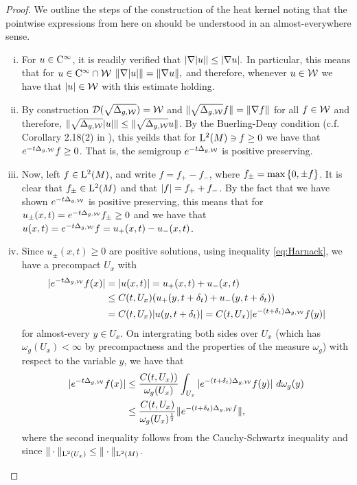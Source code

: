 \documentclass[a4paper, 12pt]{amsart}
\begin{document}
\begin{proof}
We outline the steps of the construction of the heat kernel
noting that the pointwise expressions from here on should be
understood in an almost-everywhere sense.
\begin{enumerate}[(i)]
\item For $u \in {\rm C}^{\infty}_{\rm {}}$, it is readily verified that 
	$| \nabla |u|| \leq | \nabla u|.$
	In particular, this means that 
	for $u \in {\rm C}^{\infty}_{\rm {}} \cap \mathcal{W}$
	$\| \nabla |u| \| = \| \nabla u \|,$
	and therefore, whenever $u \in \mathcal{W}$
	we have that $|u| \in \mathcal{W}$ 
	with this estimate holding.

\item 	By construction ${\mathcal{D}}(\sqrt{\Delta_{g, \mathcal{W}}}) = \mathcal{W}$
	and $\| \sqrt{\Delta_{g,\mathcal{W}}} f \| = \| \nabla f \|$
	for all $f \in \mathcal{W}$ and therefore, 
	$\| \sqrt{\Delta_{g, \mathcal{W}}} |u| \| 
		\leq \| \sqrt{\Delta_{g, \mathcal{W}}} u \|$. 
	By the Buerling-Deny condition (c.f.  Corollary 2.18(2) in  \cite{El-Maati}), 
	this yeilds that for ${\rm L}^{2}_{\rm {}}(M) \ni f \geq 0$
	we have that  $e^{-t \Delta_{g,\mathcal{W}}} f \geq 0$. That is, the semigroup 
	$e^{-t \Delta_{g,\mathcal{W}}}$ is positive preserving.  

\item Now, left $f \in {\rm L}^{2}_{\rm {}}(M)$, and write
	$f = f_+ - f_-$, where $f_{\pm} = \max\left\{0,\pm f\right\}$.
	It is clear that $f_{\pm} \in {\rm L}^{2}_{\rm {}}(M)$
	and that $|f| = f_+ + f_-$.
	By the fact that we have shown $e^{-t\Delta_{g,\mathcal{W}}}$ 
	is positive preserving, this means that
	for $u_{\pm} (x,t) = e^{-t\Delta_{g,\mathcal{W}}} f_{\pm} \geq 0$	
	and we have that $u(x,t) = e^{-t \Delta_{g,\mathcal{W}}} f = u_+(x,t) - u_-(x,t)$.

\item  Since $u_{\pm}(x,t) \geq 0$ are positive solutions,
	using inequality \eqref{eq:Harnack}, we have a precompact $U_x$ 
	with 
	\begin{align*} 
	|e^{-t \Delta_{g,\mathcal{W}}}f(x)|  &= |u(x,t)| = u_+(x,t) + u_-(x,t) \\
		&\leq C(t,U_x) (u_+(y,t+\delta_t) + u_-(y,t+\delta_t)) \\
		&= C(t,U_x) |u(y,t + \delta_t)|
		= C(t,U_x)  |e^{-(t + \delta_t) \Delta_{g,\mathcal{W}}}f(y)|
	\end{align*} 
	for almost-every $y \in U_x$.
	On intergrating both sides over $U_x$ (which has $\omega_g(U_x) < \infty$
	by precompactness and the properties of the measure $\omega_g$) with respect
	to the variable $y$,
	we have that
	\begin{align*} 
	|e^{-t \Delta_{g,\mathcal{W}}}f(x)| 
		&\leq \frac{C(t,U_x))}{\omega_g(U_x)} \int_{U_x} |e^{-(t + \delta_t) \Delta_{g,\mathcal{W}}}f(y)|\ d\omega_g(y) \\
		&\leq \frac{C(t,U_x)}{\omega_g(U_x)^{\frac{1}{2}}} \| e^{-(t + \delta_t) \Delta_{g,\mathcal{W}}f} \|,
	\end{align*}
	where the second inequality follows from the Cauchy-Schwartz
	inequality and since $\| \cdot \|_{{\rm L}^{2}_{\rm {}}(U_x)} \leq \| \cdot \|_{{\rm L}^{2}_{\rm {}}(M)}$.


\end{enumerate}
\end{proof}
\end{document}
